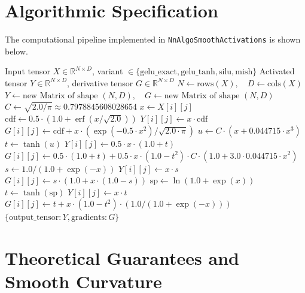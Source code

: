 \documentclass[11pt,a4paper]{article}
\theoremstyle{definition}
\begin{document}
\section{Algorithmic Specification}

The computational pipeline implemented in \texttt{NnAlgoSmoothActivations} is shown below.

\begin{algorithm}[H]
\caption{Smooth Activations Forward Evaluation and Analytic Derivatives}
\begin{algorithmic}[1]
\Require Input tensor $X \in \mathbb{R}^{N \times D}$, variant $\in \{\text{gelu\_exact}, \text{gelu\_tanh}, \text{silu}, \text{mish}\}$
\Ensure Activated tensor $Y \in \mathbb{R}^{N \times D}$, derivative tensor $G \in \mathbb{R}^{N \times D}$
\State $N \gets \text{rows}(X), \quad D \gets \text{cols}(X)$
\State $Y \gets \text{new Matrix of shape } (N, D), \quad G \gets \text{new Matrix of shape } (N, D)$
\State $C \gets \sqrt{2.0 / \pi} \approx 0.7978845608028654$
        \State $x \gets X[i][j]$
            \State $\text{cdf} \gets 0.5 \cdot (1.0 + \operatorname{erf}(x / \sqrt{2.0}))$
            \State $Y[i][j] \gets x \cdot \text{cdf}$
            \State $G[i][j] \gets \text{cdf} + x \cdot (\exp(-0.5 \cdot x^2) / \sqrt{2.0 \cdot \pi})$
            \State $u \gets C \cdot (x + 0.044715 \cdot x^3)$
            \State $t \gets \tanh(u)$
            \State $Y[i][j] \gets 0.5 \cdot x \cdot (1.0 + t)$
            \State $G[i][j] \gets 0.5 \cdot (1.0 + t) + 0.5 \cdot x \cdot (1.0 - t^2) \cdot C \cdot (1.0 + 3.0 \cdot 0.044715 \cdot x^2)$
            \State $s \gets 1.0 / (1.0 + \exp(-x))$
            \State $Y[i][j] \gets x \cdot s$
            \State $G[i][j] \gets s \cdot (1.0 + x \cdot (1.0 - s))$
            \State $\text{sp} \gets \ln(1.0 + \exp(x))$
            \State $t \gets \tanh(\text{sp})$
            \State $Y[i][j] \gets x \cdot t$
            \State $G[i][j] \gets t + x \cdot (1.0 - t^2) \cdot (1.0 / (1.0 + \exp(-x)))$
        \EndIf
    \EndFor
\EndFor
\State \Return $\{\text{output\_tensor}: Y, \text{gradients}: G\}$
\end{algorithmic}
\end{algorithm}

\section{Theoretical Guarantees and Smooth Curvature}
\end{document}
